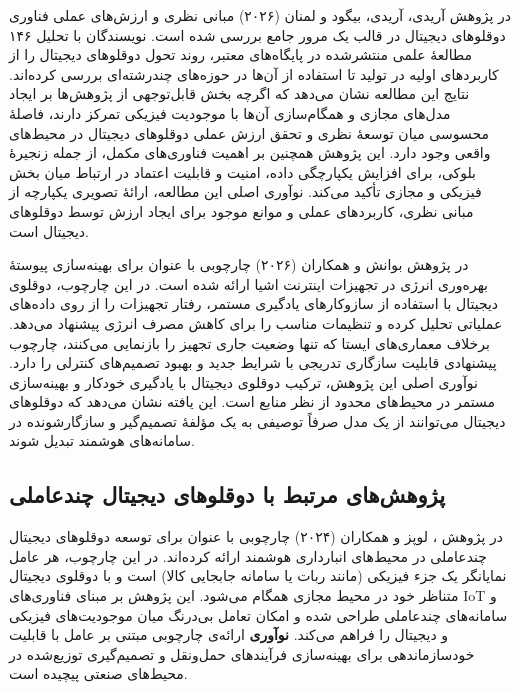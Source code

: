 در پژوهش
آریدی، آریدی، بیگود و لمنان (۲۰۲۶)
\cite{aridi2026theoretical}
مبانی نظری و ارزش‌های عملی فناوری دوقلوهای دیجیتال در قالب یک مرور جامع بررسی شده است. نویسندگان با تحلیل ۱۴۶ مطالعهٔ علمی منتشرشده در پایگاه‌های معتبر، روند تحول دوقلوهای دیجیتال را از کاربردهای اولیه در تولید تا استفاده از آن‌ها در حوزه‌های چندرشته‌ای بررسی کرده‌اند. نتایج این مطالعه نشان می‌دهد که اگرچه بخش قابل‌توجهی از پژوهش‌ها بر ایجاد مدل‌های مجازی و همگام‌سازی آن‌ها با موجودیت فیزیکی تمرکز دارند، فاصلهٔ محسوسی میان توسعهٔ نظری و تحقق ارزش عملی دوقلوهای دیجیتال در محیط‌های واقعی وجود دارد. این پژوهش همچنین بر اهمیت فناوری‌های مکمل، از جمله زنجیرهٔ بلوکی، برای افزایش یکپارچگی داده، امنیت و قابلیت اعتماد در ارتباط میان بخش فیزیکی و مجازی تأکید می‌کند. نوآوری اصلی این مطالعه، ارائهٔ تصویری یکپارچه از مبانی نظری، کاربردهای عملی و موانع موجود برای ایجاد ارزش توسط دوقلوهای دیجیتال است.



در پژوهش
بوانش و همکاران (۲۰۲۶)
\cite{bhuvanesh2026selflearningdt}
چارچوبی با عنوان
برای بهینه‌سازی پیوستهٔ بهره‌وری انرژی در تجهیزات اینترنت اشیا ارائه شده است. در این چارچوب، دوقلوی دیجیتال با استفاده از سازوکارهای یادگیری مستمر، رفتار تجهیزات را از روی داده‌های عملیاتی تحلیل کرده و تنظیمات مناسب را برای کاهش مصرف انرژی پیشنهاد می‌دهد. برخلاف معماری‌های ایستا که تنها وضعیت جاری تجهیز را بازنمایی می‌کنند، چارچوب پیشنهادی قابلیت سازگاری تدریجی با شرایط جدید و بهبود تصمیم‌های کنترلی را دارد. نوآوری اصلی این پژوهش، ترکیب دوقلوی دیجیتال با یادگیری خودکار و بهینه‌سازی مستمر در محیط‌های محدود از نظر منابع است. این یافته نشان می‌دهد که دوقلوهای دیجیتال می‌توانند از یک مدل صرفاً توصیفی به یک مؤلفهٔ تصمیم‌گیر و سازگارشونده در سامانه‌های هوشمند تبدیل شوند.



\subsection{پژوهش‌های مرتبط با دوقلوهای دیجیتال چندعاملی}

در پژوهش \cite{lopez2024madtwin}، 
لوپز و همکاران (۲۰۲۴)
چارچوبی با عنوان  برای توسعه دوقلوهای دیجیتال چندعاملی در محیط‌های انبارداری هوشمند ارائه کرده‌اند. در این چارچوب، هر عامل نمایانگر یک جزء فیزیکی (مانند ربات یا سامانه جابجایی کالا) است و با دوقلوی دیجیتال متناظر خود در محیط مجازی همگام می‌شود. این پژوهش بر مبنای فناوری‌های 
 \gls{IoT}
  و سامانه‌های چندعاملی طراحی شده و امکان تعامل بی‌درنگ میان موجودیت‌های فیزیکی و دیجیتال را فراهم می‌کند. \textbf{نوآوری} ارائه‌ی چارچوبی مبتنی بر عامل با قابلیت خودسازماندهی برای بهینه‌سازی فرآیندهای حمل‌ونقل و تصمیم‌گیری توزیع‌شده در محیط‌های صنعتی پیچیده است.

